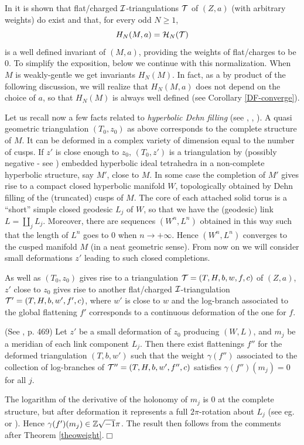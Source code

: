 In \cite{BB2} it is shown that flat/charged ${\mathcal I}$-triangulations ${\mathcal T}$
of $(Z,a)$ (with arbitrary weights) do exist and that, for every odd
$N\geq 1$,
$$ H_N(M,a)={\mathcal H}_N({\mathcal T})$$ is a well defined invariant of $(M,a)$,
providing the weights of flat/charges to be $0$. To simplify the
exposition, below we continue with this normalization.  When $M$ is
weakly-gentle we get invariants $H_N(M)$. In fact, as a by product of
the following discussion, we will realize that $H_N(M,a)$ does not
depend on the choice of $a$, so that $H_N(M)$ is always well defined
(see Corollary \ref{DF-converge}).

\medskip

Let us recall now a few facts related to {\it hyperbolic Dehn filling}
(see \cite{Th}, \cite{BP}, \cite{Pe-Po}). A quasi geometric
triangulation $(T_0,z_0)$ as above corresponds to the complete
structure of $M$. It can be deformed in a complex variety of dimension
equal to the number of cusps. If $z'$ is close enough to $z_0$,
$(T_0,z')$ is a triangulation by (possibly negative - see
\cite{Pe-Po}) embedded hyperbolic ideal tetrahedra in a non-complete
hyperbolic structure, say $M'$, close to $M$.  In some case the
completion of $M'$ gives rise to a compact closed hyperbolic manifold
$W$, topologically obtained by Dehn filling of the (truncated) cusps
of $M$. The core of each attached solid torus is a ``short'' simple
closed geodesic $L_j$ of $W$, so that we have the (geodesic) link
$\textstyle L=\coprod_j L_j$. Moreover, there are sequences
$(W^n,L^n)$ obtained in this way such that the length of $L^n$ goes to
$0$ when $n\to +\infty$. Hence $(W^n,L^n)$ converges to the cusped
manifold $M$ (in a neat geometric sense). From now on we will consider
small deformations $z'$ leading to such closed completions.
\smallskip

As well as $(T_0,z_0)$ gives rise to a triangulation ${\mathcal T}=(T,H,b,w,f,c)$
of $(Z,a)$, $z'$ close to $z_0$ gives rise to another
flat/charged ${\mathcal I}$-triangulation ${\mathcal T}'=(T,H,b,w',f',c)$, where $w'$ is
close to $w$ and the log-branch associated to the global flattening
$f'$ corresponds to a continuous deformation of the one for $f$.

\begin{lem}\label{deformedlogb}{\rm (See \cite{N}, p. 469) Let $z'$ be
a small deformation of $z_0$ producing $(W,L)$, and $m_j$ be a
meridian of each link component $L_j$. Then there exist flattenings
$f''$ for the deformed triangulation $(T,b,w')$ such that the weight
$\gamma(f'')$ associated to the collection of log-branches of
${\mathcal T}''=(T,H,b,w',f'',c)$ satisfies $\gamma(f'')(m_j)=0$ for all $j$.}
\end{lem}
 The logarithm of the derivative of the
holonomy of $m_j$ is $0$ at the complete structure, but after
deformation it represents a full
$2\pi$-rotation about $L_j$ (see eg. \cite{Th} or \cite{BP}).
Hence $\gamma(f')(m_j) \in \mathbb{Z}\sqrt{-1}\pi$. The result then follows from
the comments after Theorem \ref{theoweight}.\hfill$\Box$
\smallskip

